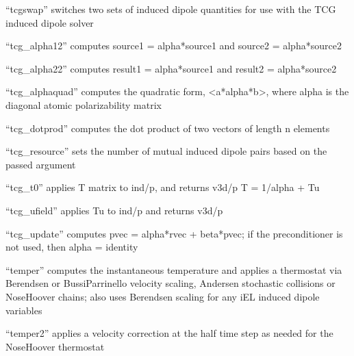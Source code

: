 \documentclass[letterpaper,11pt,english]{sphinxmanual}
\begin{document}

“tcgswap” switches two sets of induced dipole quantities for
use with the TCG induced dipole solver


“tcg\_alpha12” computes source1 = alpha*source1 and
source2 = alpha*source2


“tcg\_alpha22” computes result1 = alpha*source1 and
result2 = alpha*source2


“tcg\_alphaquad” computes the quadratic form, \textless{}a*alpha*b\textgreater{},
where alpha is the diagonal atomic polarizability matrix


“tcg\_dotprod” computes the dot product of two vectors
of length n elements


“tcg\_resource” sets the number of mutual induced dipole
pairs based on the passed argument


“tcg\_t0” applies T matrix to ind/p, and returns v3d/p
T = 1/alpha + Tu


“tcg\_ufield” applies \sphinxhyphen{}Tu to ind/p and returns v3d/p


“tcg\_update” computes pvec = alpha*rvec + beta*pvec;
if the preconditioner is not used, then alpha = identity


“temper” computes the instantaneous temperature and applies a
thermostat via Berendsen or Bussi\sphinxhyphen{}Parrinello velocity scaling,
Andersen stochastic collisions or Nose\sphinxhyphen{}Hoover chains; also uses
Berendsen scaling for any iEL induced dipole variables


“temper2” applies a velocity correction at the half time step
as needed for the Nose\sphinxhyphen{}Hoover thermostat

\end{document}
